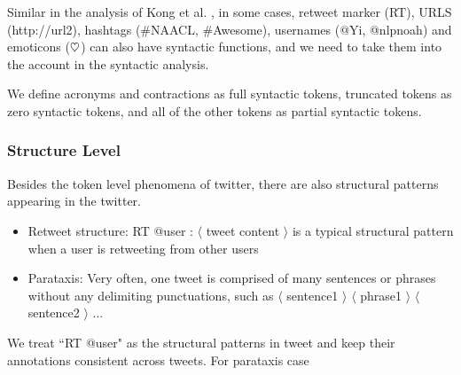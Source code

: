 \documentclass[11pt,letterpaper]{article}
\newcommand{\heart}{\ensuremath\heartsuit}
\begin{document}
Similar in the analysis of Kong et al. , in some cases, retweet marker (RT), URLS (http://url2), hashtags (\#NAACL, \#Awesome), usernames (@Yi, @nlpnoah) and emoticons ($\heart$) can also have syntactic functions, and we need to take them into the account in the syntactic analysis.

We define acronyms and contractions as full syntactic tokens, truncated tokens as zero syntactic tokens, and all of the other tokens as partial syntactic tokens.

\subsubsection{Structure Level}
Besides the token level phenomena of twitter, there are also structural patterns appearing in the twitter.

\begin{itemize}
\item Retweet structure: RT @user :  $\langle$ tweet content $\rangle$ is a typical structural pattern when a user is retweeting from other users
\item Parataxis: Very often, one tweet is comprised of many sentences or phrases without any delimiting punctuations, such as $\langle$ sentence1 $\rangle$ $\langle$ phrase1 $\rangle$ $\langle$ sentence2 $\rangle$ ...
\end{itemize}

We treat ``RT @user" as the structural patterns in tweet and keep their annotations consistent across tweets. For parataxis case

\end{document}
